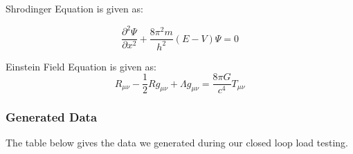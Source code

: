 \documentclass[11pt]{article}
\begin{document}
				\begin{large}
					Shrodinger Equation is given as:
				\end{large}
				$$ \frac{\partial^2 \Psi}{\partial x^2}+\frac{8\pi^2m}{h^2}(E-V)\Psi = 0$$
				\begin{Large}
					Einstein Field Equation is given as:
					$$ R_{\mu\nu}-\frac{1}{2}Rg_{\mu\nu}+\Lambda g_{\mu\nu} = \frac{8\pi G}{c^4}T_{\mu\nu} $$
				\end{Large}
				
			\subsubsection{Generated Data}
				The table below gives the data we generated during our closed loop load testing.
				\\
				\\
				\label{table:tab1} 
				\\
				\\
				\\
				\\
				\\
				\\
				\\
				\\
				\\
				\\
\end{document}
